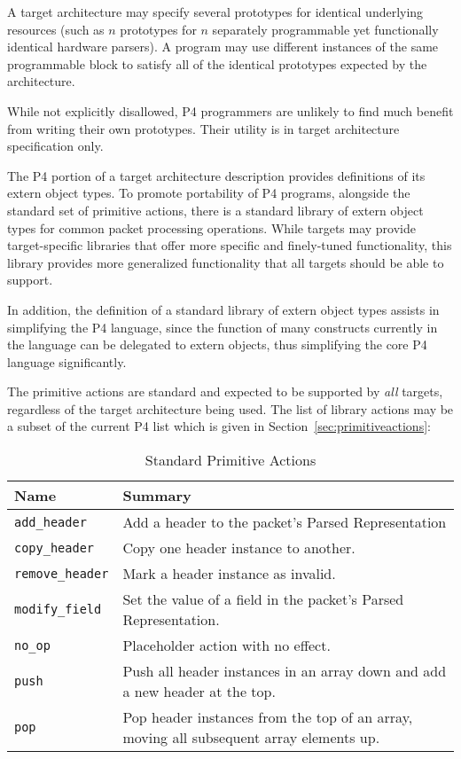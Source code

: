 \documentclass[12pt]{article}
\begin{document}
A target architecture may specify several prototypes for identical underlying
resources (such as $n$ prototypes for $n$ separately programmable yet
functionally identical hardware parsers).  A program may use different
instances of the same programmable block to satisfy all of the identical
prototypes expected by the architecture.

While not explicitly disallowed, P4 programmers are unlikely to find much
benefit from writing their own prototypes.  Their utility is in target
architecture specification only.



The P4 portion of a target architecture description provides
definitions of its extern object types.
To promote portability of P4 programs, alongside the standard set of primitive
actions, there is a standard library of extern object types
for common packet processing operations.  While targets may provide
target-specific libraries that offer more specific and finely-tuned
functionality, this library provides more generalized functionality that
all targets should be able to support.

In addition, the definition of a standard library of extern object types
assists in simplifying the P4 language, since the function of many constructs
currently in the language can be delegated to extern objects, thus simplifying
the core P4 language significantly.


The primitive actions are standard and expected to be supported
by \textit{all} targets, regardless of the target architecture being used.
The list of library actions may be a subset of the current P4 list which
is given in Section~\ref{sec:primitiveactions}:

\begin{table}[H]
\begin{center}
\begin{tabular}{| l | p{} |} \hline
\textbf{Name} &
\textbf{Summary} \\ \hline
\texttt{add_header} &
Add a header to the packet's Parsed Representation \\ \hline
\texttt{copy_header} &
Copy one header instance to another. \\ \hline
\texttt{remove_header} &
Mark a header instance as invalid. \\ \hline
\texttt{modify_field} &
Set the value of a field in the packet's Parsed Representation. \\ \hline
\texttt{no_op} &
Placeholder action with no effect. \\ \hline
\texttt{push} &
Push all header instances in an array down and add a new header at the top. \\ \hline
\texttt{pop} &
Pop header instances from the top of an array, moving all subsequent array elements up. \\ \hline
\end{tabular}
\end{center}
\caption{Standard Primitive Actions}
\label{tab:primitiveactions}
\end{table}
\end{document}
